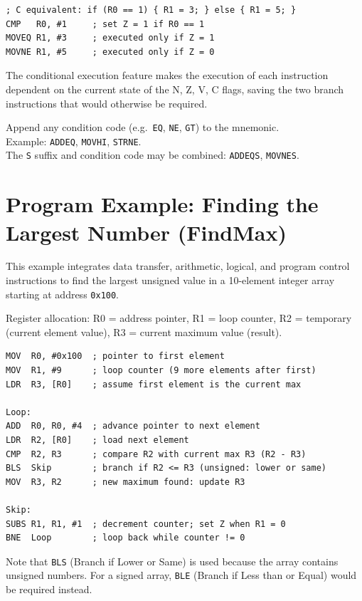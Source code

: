 \documentclass[11pt, a4paper, notitlepage]{report}
\theoremstyle{definition}
\theoremstyle{remark}
\theoremstyle{definition}
\begin{document}
\begin{lstlisting}
; C equivalent: if (R0 == 1) { R1 = 3; } else { R1 = 5; }
CMP   R0, #1     ; set Z = 1 if R0 == 1
MOVEQ R1, #3     ; executed only if Z = 1
MOVNE R1, #5     ; executed only if Z = 0
\end{lstlisting}

The conditional execution feature makes the execution of each instruction dependent on the current state of the N, Z, V, C flags, saving the two branch instructions that would otherwise be required.

\begin{keyresult}[title={Conditional Execution Syntax}]
Append any condition code (e.g.\ \texttt{EQ}, \texttt{NE}, \texttt{GT}) to the mnemonic.\\
Example: \texttt{ADDEQ}, \texttt{MOVHI}, \texttt{STRNE}.\\
The \texttt{S} suffix and condition code may be combined: \texttt{ADDEQS}, \texttt{MOVNES}.
\end{keyresult}

\section{Program Example: Finding the Largest Number (FindMax)}

This example integrates data transfer, arithmetic, logical, and program control instructions to find the largest unsigned value in a 10-element integer array starting at address \texttt{0x100}.

Register allocation: R0 = address pointer, R1 = loop counter, R2 = temporary (current element value), R3 = current maximum value (result).

\begin{lstlisting}
MOV  R0, #0x100  ; pointer to first element
MOV  R1, #9      ; loop counter (9 more elements after first)
LDR  R3, [R0]    ; assume first element is the current max

Loop:
ADD  R0, R0, #4  ; advance pointer to next element
LDR  R2, [R0]    ; load next element
CMP  R2, R3      ; compare R2 with current max R3 (R2 - R3)
BLS  Skip        ; branch if R2 <= R3 (unsigned: lower or same)
MOV  R3, R2      ; new maximum found: update R3

Skip:
SUBS R1, R1, #1  ; decrement counter; set Z when R1 = 0
BNE  Loop        ; loop back while counter != 0
\end{lstlisting}

Note that \texttt{BLS} (Branch if Lower or Same) is used because the array contains unsigned numbers. For a signed array, \texttt{BLE} (Branch if Less than or Equal) would be required instead.
\end{document}
